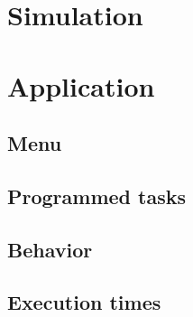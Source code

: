 \documentclass[titlepage]{article}%
\begin{document}
\section{Simulation} %
\label{sec:simulation}






\section{Application} %
\label{sec:application}



\subsection{Menu} %
\label{sub:menu}




\subsection{Programmed tasks} %
\label{sub:programmed_tasks}




\subsection{Behavior} %
\label{sub:behavior}




\subsection{Execution times} %
\label{sub:execution_times}




\end{document}
